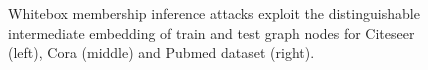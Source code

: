 \begin{figure}[!htb]
\centering
{}
\caption{Whitebox membership inference attacks exploit the distinguishable intermediate embedding of train and test graph nodes for Citeseer (left), Cora (middle) and Pubmed dataset (right).}
\label{embedding}
\end{figure}



